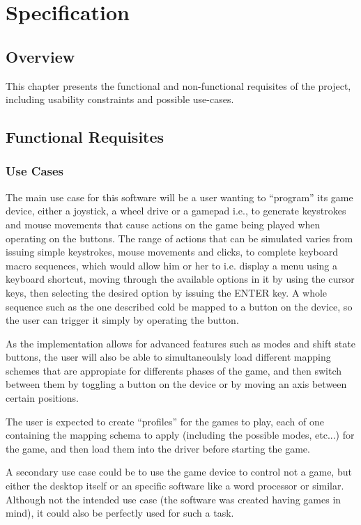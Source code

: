 \chapter{Specification}\label{chap:specification}
\section{Overview} 
This chapter presents the functional and non-functional requisites of the project, including usability constraints and possible use-cases.

\section{Functional Requisites} 

\subsection{Use Cases}
The main use case for this software will be a user wanting to ``program'' its game device, either a joystick, a wheel drive or a gamepad i.e., to generate keystrokes and mouse movements that cause actions on the game being played when operating on the buttons. The range of actions that can be simulated varies from issuing simple keystrokes, mouse movements and clicks, to complete keyboard macro sequences, which would allow him or her to i.e. display a menu using a keyboard shortcut, moving through the available options in it by using the cursor keys, then selecting the desired option by issuing the ENTER key. A whole sequence such as the one described cold be mapped to a button on the device, so the user can trigger it simply by operating the button.

As the implementation allows for advanced features such as modes and shift state buttons, the user will also be able to simultaneoulsly load different mapping schemes that are appropiate for differents phases of the game, and then switch between them by toggling a button on the device or by moving an axis between certain positions.

The user is expected to create ``profiles'' for the games to play, each of one containing the mapping schema to apply (including the possible modes, etc...) for the game, and then load them into the driver before starting the game.

A secondary use case could be to use the game device to control not a game, but either the desktop itself or an specific software like a word processor or similar. Although not the intended use case (the software was created having games in mind), it could also be perfectly used for such a task.

